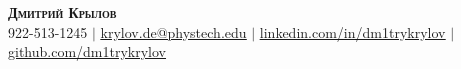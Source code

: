 \begin{center}
  \textbf{\Huge \scshape Дмитрий Крылов} \\ \vspace{1pt}
  \small 922-513-1245 $|$ \href{mailto:krylov.de@phystech.edu}{\underline{krylov.de@phystech.edu}} $|$
  \href{https://linkedin.com/in/dm1trykrylov}{\underline{linkedin.com/in/dm1trykrylov}} $|$
  \href{https://github.com/dm1trykrylov}{\underline{github.com/dm1trykrylov}}
\end{center}
